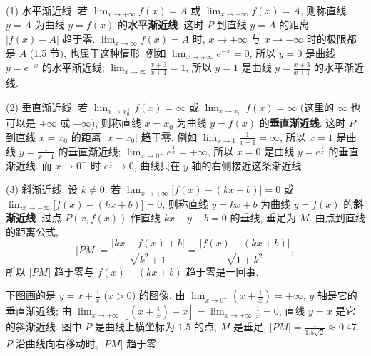 \documentclass[UTF8,openany]{ctexbook}
\theoremstyle{chinesetextbook}
\begin{document}
(1) 水平渐近线. 若 $\displaystyle\lim_{x\to+\infty}f(x)=A$ 或 $\displaystyle\lim_{x\to-\infty}f(x)=A$, 则称直线 $y=A$ 为曲线 $y=f(x)$ 的\textbf{水平渐近线}. 这时 $P$ 到直线 $y=A$ 的距离 $|f(x)-A|$ 趋于零. $\displaystyle\lim_{x\to\infty}f(x)=A$ 时, $x\to+\infty$ 与 $x\to-\infty$ 时的极限都是 $A$ (1.5 节), 也属于这种情形. 例如 $\displaystyle\lim_{x\to+\infty}e^{-x}=0$, 所以 $y=0$ 是曲线 $y=e^{-x}$ 的水平渐近线; $\displaystyle\lim_{x\to\infty}\frac{x+3}{x+1}=1$, 所以 $y=1$ 是曲线 $\displaystyle y=\frac{x+3}{x+1}$ 的水平渐近线.

(2) 垂直渐近线. 若 $\displaystyle\lim_{x\to x_0^+}f(x)=\infty$ 或 $\displaystyle\lim_{x\to x_0^-}f(x)=\infty$ (这里的 $\infty$ 也可以是 $+\infty$ 或 $-\infty$), 则称直线 $x=x_0$ 为曲线 $y=f(x)$ 的\textbf{垂直渐近线}. 这时 $P$ 到直线 $x=x_0$ 的距离 $|x-x_0|$ 趋于零. 例如 $\displaystyle\lim_{x\to1}\frac1{x-1}=\infty$, 所以 $x=1$ 是曲线 $\displaystyle y=\frac1{x-1}$ 的垂直渐近线; $\displaystyle\lim_{x\to0^+}e^{\frac1x}=+\infty$, 所以 $x=0$ 是曲线 $y=e^{\frac1x}$ 的垂直渐近线. 而 $x\to0^-$ 时 $e^{\frac1x}\to0$, 曲线只在 $y$ 轴的右侧接近这条渐近线.

(3) 斜渐近线. 设 $k\ne0$. 若 $\displaystyle\lim_{x\to+\infty}\bigl[f(x)-(kx+b)\bigr]=0$ 或 $\displaystyle\lim_{x\to-\infty}\bigl[f(x)-(kx+b)\bigr]=0$, 则称直线 $y=kx+b$ 为曲线 $y=f(x)$ 的\textbf{斜渐近线}. 过点 $P(x,f(x))$ 作直线 $kx-y+b=0$ 的垂线, 垂足为 $M$. 由点到直线的距离公式,
\[
|PM|=\frac{|kx-f(x)+b|}{\sqrt{k^2+1}}=\frac{\bigl|f(x)-(kx+b)\bigr|}{\sqrt{1+k^2}},
\]
所以 $|PM|$ 趋于零与 $f(x)-(kx+b)$ 趋于零是一回事.

下图画的是 $\displaystyle y=x+\frac1x$ ($x>0$) 的图像. 由 $\displaystyle\lim_{x\to0^+}\left(x+\frac1x\right)=+\infty$, $y$ 轴是它的垂直渐近线; 由 $\displaystyle\lim_{x\to+\infty}\left[\left(x+\frac1x\right)-x\right]=\lim_{x\to+\infty}\frac1x=0$, 直线 $y=x$ 是它的斜渐近线. 图中 $P$ 是曲线上横坐标为 $1.5$ 的点, $M$ 是垂足, $\displaystyle|PM|=\frac1{1.5\sqrt2}\approx0.47$. $P$ 沿曲线向右移动时, $|PM|$ 趋于零.
\begin{center}
\end{center}
\end{document}
